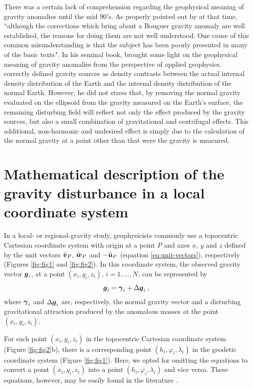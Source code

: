 \documentclass[extra]{gji}
\begin{document}
There was a certain lack of comprehension regarding the
geophysical meaning of gravity anomalies until the
mid 90's.
As properly pointed out by \citet{chapin1996} at that time, 
``although the corrections which bring about a Bouguer 
gravity anomaly are well established, the reasons for doing
them are not well understood. One cause of this common 
misunderstanding is that the subject has been poorly presented in
many of the basic texts".
In his seminal book, \citet{blakely1996} brought some light
on the geophysical meaning of gravity anomalies from the 
perspective of applied geophysics. \citet{blakely1996} correctly
defined gravity sources as density contrasts between the actual
internal density distribution of the Earth and the internal density
distribution of the normal Earth.
However, he did not stress that, by removing the normal gravity 
evaluated on the ellipsoid from the gravity measured 
on the Earth's surface, the remaining disturbing field will reflect 
not only the effect produced by the gravity sources, but also a
small combination of gravitational and centrifugal effects.
This additional, non-harmonic and undesired effect is 
simply due to the calculation of the normal gravity at a point
other than that were the gravity is measured.


\section{Mathematical description of the gravity disturbance in a local coordinate system}

In a local- or regional-gravity study, 
geophysicists commonly use a topocentric Cartesian coordinate system
with origin at a point $P$ and axes $x$, $y$ and $z$ defined
by the unit vectors $\hat{\mitbf{v}}_{P}$,
$\hat{\mitbf{w}}_{P}$ and $-\hat{\mitbf{u}}_{P}$ 
(equation \ref{eq:unit-vectors}), respectively
(Figures \ref{fig:fig1} and \ref{fig:fig2}).
In this coordinate system, the observed gravity vector
$\mitbf{g}_{i}$, at a point $(x_{i}, y_{i}, z_{i})$, 
$i = 1, ..., N$, can be represented by
\begin{equation}
\mitbf{g}_{i} = \mitbf{\gamma}_{i} + \Delta \mitbf{g}_{i} \: ,
\label{eq:gravity-vector}
\end{equation}
where $\mitbf{\gamma}_{i}$ and $\Delta \mitbf{g}_{i}$
are, respectively, the normal gravity vector and a
disturbing gravitational attraction produced by the anomalous 
masses at the point $(x_{i}, y_{i}, z_{i})$.

For each point $(x_{i}, y_{i}, z_{i})$ in the topocentric
Cartesian coordinate system (Figure \ref{fig:fig2}b), there is
a corresponding point $(h_{i}, \varphi_{i}, \lambda_{i})$
in the geodetic coordinate system (Figure \ref{fig:fig1}).
Here, we opted for omitting the equations to convert a point
$(x_{i}, y_{i}, z_{i})$ into a point $(h_{i}, \varphi_{i}, \lambda_{i})$
and vice versa. These equations, however, may be easily
found in the literature \citep[e.g.,][]{heiskanen-moritz1967, soler1976, torge2012, bouman_etal2013}.
\end{document}
